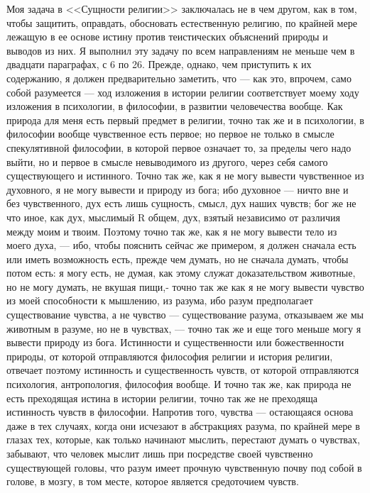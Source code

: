 \documentclass[12pt]{article}
\begin{document}
Моя задача в <<Сущности религии>> заключалась не в чем другом, как в том, чтобы защитить, оправдать, обосновать естественную религию, по крайней мере лежащую в ее основе истину против теистических объяснений природы и выводов из них. Я выполнил эту задачу по всем направлениям не меньше чем в двадцати параграфах, с 6 по 26. Прежде, однако, чем приступить к их содержанию, я должен предварительно заметить, что --- как это, впрочем, само собой разумеется --- ход изложения в истории религии соответствует моему ходу изложения в психологии, в философии, в развитии человечества вообще. Как природа для меня есть первый предмет в религии, точно так же и в психологии, в философии вообще чувственное есть первое; но первое не только в смысле спекулятивной философии, в которой первое означает то, за пределы чего надо выйти, но и первое в смысле невыводимого из другого, через себя самого существующего и истинного. Точно так же, как я не могу вывести чувственное из духовного, я не могу вывести и природу из бога; ибо духовное --- ничто вне и без чувственного, дух есть лишь сущность, смысл, дух наших чувств; бог же не что иное, как дух, мыслимый R общем, дух, взятый независимо от различия между моим и твоим. Поэтому точно так же, как я не могу вывести тело из моего духа, --- ибо, чтобы пояснить сейчас же примером, я должен сначала есть или иметь возможность есть, прежде чем думать, но не сначала думать, чтобы потом есть: я могу есть, не думая, как этому служат доказательством животные, но не могу думать, не вкушая пищи,- точно так же как я не могу вывести чувство из моей способности к мышлению, из разума, ибо разум предполагает существование чувства, а не чувство --- существование разума, отказываем же мы животным в разуме, но не в чувствах, --- точно так же и еще того меньше могу я вывести природу из бога. Истинности и существенности или божественности природы, от которой отправляются философия религии и история религии, отвечает поэтому истинность и существенность чувств, от которой отправляются психология, антропология, философия вообще. И точно так же, как природа не есть преходящая истина в истории религии, точно так же не преходяща истинность чувств в философии. Напротив того, чувства --- остающаяся основа даже в тех случаях, когда они исчезают в абстракциях разума, по крайней мере в глазах тех, которые, как только начинают мыслить, перестают думать о чувствах, забывают, что человек мыслит лишь при посредстве своей чувственно существующей головы, что разум имеет прочную чувственную почву под собой в голове, в мозгу, в том месте, которое является средоточием чувств. 
\end{document}
